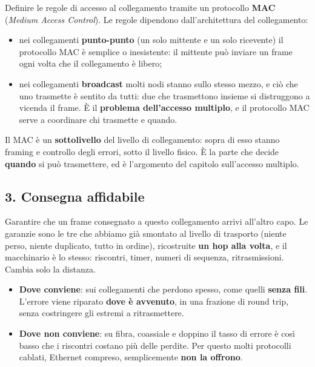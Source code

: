 Definire le regole di accesso al collegamento tramite un protocollo \textbf{MAC} (\emph{Medium Access Control}). Le regole
dipendono dall'architettura del collegamento:

\begin{itemize}
    \item nei collegamenti \textbf{punto-punto} (un solo mittente e un solo ricevente) il protocollo MAC è semplice o inesistente:
          il mittente può inviare un frame ogni volta che il collegamento è libero;
    \item nei collegamenti \textbf{broadcast} molti nodi stanno sullo stesso mezzo, e ciò che uno trasmette è sentito da tutti: due
          che trasmettono insieme si distruggono a vicenda il frame. È il \textbf{problema dell'accesso multiplo}, e il protocollo MAC
          serve a coordinare chi trasmette e quando.
\end{itemize}

Il MAC è un \textbf{sottolivello} del livello di collegamento: sopra di esso stanno framing e controllo degli errori, sotto il
livello fisico. È la parte che decide \textbf{quando} si può trasmettere, ed è l'argomento del capitolo sull'accesso multiplo.


\subsection{3. Consegna affidabile}

Garantire che un frame consegnato a questo collegamento arrivi all'altro capo. Le garanzie sono le tre che abbiamo già smontato
al livello di trasporto (niente perso, niente duplicato, tutto in ordine), ricostruite \textbf{un hop alla volta}, e il macchinario è
lo stesso: riscontri, timer, numeri di sequenza, ritrasmissioni. Cambia solo la distanza.

\begin{itemize}
    \item \textbf{Dove conviene}: sui collegamenti che perdono spesso, come quelli \textbf{senza fili}. L'errore viene riparato
          \textbf{dove è avvenuto}, in una frazione di round trip, senza costringere gli estremi a ritrasmettere.
    \item \textbf{Dove non conviene}: su fibra, coassiale e doppino il tasso di errore è così basso che i riscontri costano più delle
          perdite. Per questo molti protocolli cablati, Ethernet compreso, semplicemente \textbf{non la offrono}.
\end{itemize}

